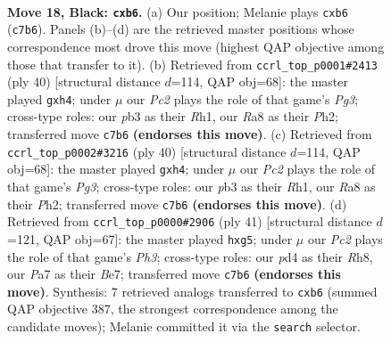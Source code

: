 \documentclass[11pt]{article}
\begin{document}
\begin{figure}[p]
\label{fig:thought-m33}
\end{figure}

\clearpage

\begin{figure}[p]\centering
\begin{subfigure}{0.46\textwidth}\centering
\resizebox{\linewidth}{!}{%
\newchessgame
\chessboard[
  setfen={rnb3k1/ppp5/1P2p1p1/3pP3/1P1P1rp1/1PN5/8/3QKBNR b K - 0 18},
  showmover=false,
  pgfstyle=straightmove, color=movearrow, markmove={c7-b6}
]}
\caption{}
\end{subfigure}\hfill
\begin{subfigure}{0.46\textwidth}\centering
\resizebox{\linewidth}{!}{%
\newchessgame
\chessboard[
  setfen={4k2r/1b1pbpp1/pN3n2/B3p3/4P2p/1Pp2PP1/P1P3BP/2K4R w k - 0 21},
  showmover=false,
  pgfstyle=straightmove, color=movearrow, markmove={g3-h4}
]}
\caption{}
\end{subfigure}
\\[4pt]
\begin{subfigure}{0.46\textwidth}\centering
\resizebox{\linewidth}{!}{%
\newchessgame
\chessboard[
  setfen={4k2r/1b1pbpp1/pN3n2/B3p3/4P2p/1Pp2PP1/P1P3BP/2K4R w k - 0 21},
  showmover=false,
  pgfstyle=straightmove, color=movearrow, markmove={g3-h4}
]}
\caption{}
\end{subfigure}\hfill
\begin{subfigure}{0.46\textwidth}\centering
\resizebox{\linewidth}{!}{%
\newchessgame
\chessboard[
  setfen={2b1k2r/4bp1p/p2pp2p/4n1P1/4P3/2N2P2/1PP5/R3KB1R b KQk - 0 21},
  showmover=false,
  pgfstyle=straightmove, color=movearrow, markmove={h6-g5}
]}
\caption{}
\end{subfigure}
\caption{\textbf{Move 18, Black: \texttt{cxb6}.} (a) Our position; Melanie plays \texttt{cxb6} (\texttt{c7b6}). Panels (b)--(d) are the retrieved master positions whose correspondence most drove this move (highest QAP objective among those that transfer to it). (b) Retrieved from \texttt{ccrl\_top\_p0001\#2413} (ply 40) [structural distance $d$=114, QAP obj=68]: the master played \texttt{gxh4}; under $\mu$ our \emph{Pc2} plays the role of that game's \emph{Pg3}; cross-type roles: our \emph{p}b3 as their \emph{R}h1, our \emph{R}a8 as their \emph{P}h2; transferred move \texttt{c7b6} \textbf{(endorses this move)}. (c) Retrieved from \texttt{ccrl\_top\_p0002\#3216} (ply 40) [structural distance $d$=114, QAP obj=68]: the master played \texttt{gxh4}; under $\mu$ our \emph{Pc2} plays the role of that game's \emph{Pg3}; cross-type roles: our \emph{p}b3 as their \emph{R}h1, our \emph{R}a8 as their \emph{P}h2; transferred move \texttt{c7b6} \textbf{(endorses this move)}. (d) Retrieved from \texttt{ccrl\_top\_p0000\#2906} (ply 41) [structural distance $d$=121, QAP obj=67]: the master played \texttt{hxg5}; under $\mu$ our \emph{Pc2} plays the role of that game's \emph{Ph3}; cross-type roles: our \emph{p}d4 as their \emph{R}h8, our \emph{P}a7 as their \emph{B}e7; transferred move \texttt{c7b6} \textbf{(endorses this move)}. Synthesis: 7 retrieved analogs transferred to \texttt{cxb6} (summed QAP objective 387, the strongest correspondence among the candidate moves); Melanie committed it via the \texttt{search} selector.}

\end{figure}
\end{document}
